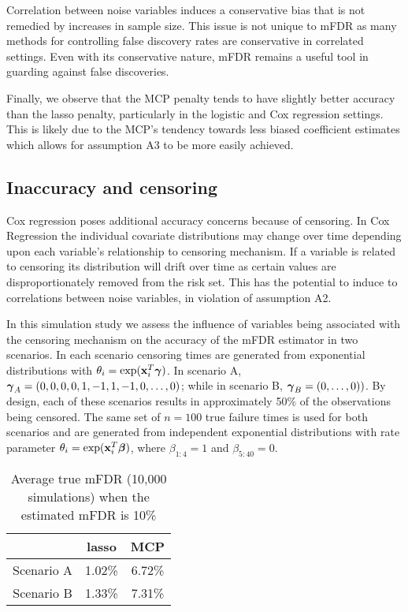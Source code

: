 Correlation between noise variables induces a conservative bias that is not remedied by increases in sample size.  This issue is not unique to mFDR as many methods for controlling false discovery rates are conservative in correlated settings.  Even with its conservative nature, mFDR remains a useful tool in guarding against false discoveries.  

Finally, we observe that the MCP penalty tends to have slightly better accuracy than the lasso penalty, particularly in the logistic and Cox regression settings.  This is likely due to the MCP's tendency towards less biased coefficient estimates which allows for assumption A3 to be more easily achieved.

\subsection{Inaccuracy and censoring}

Cox regression poses additional accuracy concerns because of censoring. In Cox Regression the individual covariate distributions may change over time depending upon each variable's relationship to censoring mechanism.  If a variable is related to censoring its distribution will drift over time as certain values are disproportionately removed from the risk set. This has the potential to induce to correlations between noise variables, in violation of assumption A2.

In this simulation study we assess the influence of variables being associated with the censoring mechanism on the accuracy of the mFDR estimator in two scenarios.  In each scenario censoring times are generated from exponential distributions with $\theta_{i} = \exp(\mathbf{x}_i^T \boldsymbol{\gamma})$. In scenario A, $\boldsymbol{\gamma}_A = (0, 0, 0, 0, 1, -1, 1, -1, 0, \ldots, 0) $; while in scenario B, $\boldsymbol{\gamma}_B = (0, \ldots, 0) )$.  By design, each of these scenarios results in approximately 50\% of the observations being censored.  The same set of $n = 100$ true failure times is used for both scenarios and are generated from independent exponential distributions with rate parameter $\theta_i = \exp(\mathbf{x}_i^T \boldsymbol{\beta})$, where $\beta_{1:4} = 1$ and $\beta_{5:40} = 0$.
\begin{table}[!htb]
 \caption{Average true mFDR (10,000 simulations) when the estimated mFDR is 10\%}
\centering
\begin{tabular}{c c c}
  \hline
 & lasso & MCP   \\  [0.5ex]
  \hline \hline 
  Scenario A & 1.02\% & 6.72\% \\ 
  Scenario B &  1.33\% & 7.31\% \\ 
   \hline
\end{tabular}
\end{table}

